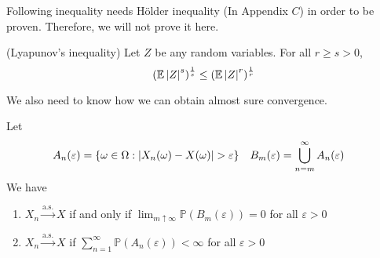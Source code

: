 \documentclass{huhtakm-template-book}
\newcommand{\prob}{\mathbb{P}}
\newcommand{\expect}{\mathbb{E}}
\begin{document}
Following inequality needs H\"older inequality (In Appendix $C$) in order to be proven. Therefore, we will not prove it here.
\begin{lem}(Lyapunov's inequality)
	Let $Z$ be any random variables. For all $r\geq s>0$,
	\begin{equation*}
		(\expect\abs{Z}^{s})^{\frac{1}{s}}\leq(\expect\abs{Z}^{r})^{\frac{1}{r}}
	\end{equation*}
\end{lem}
We also need to know how we can obtain almost sure convergence.
\begin{lem}
	\label{Chapter 7 (Lemma) Obtaining almost sure convergence}
	Let
	\begin{align*}
		A_{n}(\varepsilon)&=\{\omega\in\Omega:\abs{X_{n}(\omega)-X(\omega)}>\varepsilon\} & B_{m}(\varepsilon)&=\bigcup_{n=m}^{\infty}A_{n}(\varepsilon)
	\end{align*}
	We have
	\begin{enumerate}
		\item $X_{n}\xrightarrow{\text{a.s.}}X$ if and only if $\lim_{m\uparrow\infty}\prob(B_{m}(\varepsilon))=0$ for all $\varepsilon>0$
		\item $X_{n}\xrightarrow{\text{a.s.}}X$ if $\sum_{n=1}^{\infty}\prob(A_{n}(\varepsilon))<\infty$ for all $\varepsilon>0$
	\end{enumerate}
\end{lem}
\end{document}
